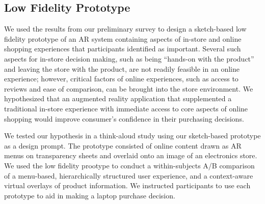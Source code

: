 \subsection{Low Fidelity Prototype}
We used the results from our preliminary survey to design a sketch-based low fidelity prototype of an AR system containing aspects of in-store and online shopping experiences that participants identified as important. Several such aspects for in-store decision making, such as being ``hands-on with the product'' and leaving the store with the product, are not readily feasible in an online experience; however, critical factors of online experiences, such as access to reviews and ease of comparison, can be brought into the store environment.  We hypothesized that an augmented reality application that supplemented a traditional in-store experience with immediate access to core aspects of online shopping would improve consumer's confidence in their purchasing decisions. 

We tested our hypothesis in a think-aloud study using our sketch-based prototype as a design prompt.  The prototype consisted of online content drawn as AR menus on transparency sheets and overlaid onto an image of an electronics store. We used the low fidelity prootype to conduct a within-subjects A/B comparison of a menu-based, hierarchically structured user experience, and a context-aware virtual overlays of product information.    We instructed participants to use each prototype to aid in making a laptop purchase decision.  

